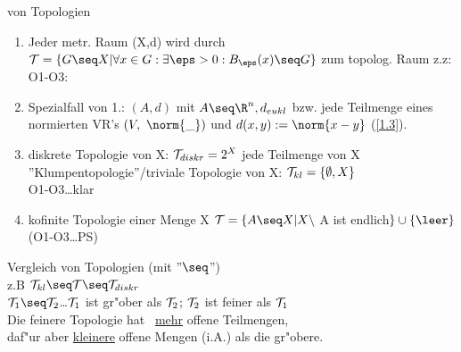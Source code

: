 \begin{beispiel}\label{2.3}{von Topologien}
\begin{enumerate}
\item Jeder metr. Raum (X,d) wird durch $\T =\{ G\seq X|\forall x\in G: \exists\eps >0: B_\eps (x)\seq G \}$ zum topolog. Raum z.z: O1-O3:
\item Spezialfall von 1.: $(A,d)$ mit $A\seq\R^n, d_{eukl}$ bzw. jede Teilmenge eines normierten VR's $(V, \norm{\_})$ und $d(x,y):=\norm{x-y}$ (\ref{1.3}).
\item diskrete Topologie von X: $\mathcal T_{diskr} =2^X$ jede Teilmenge von X\\
''Klumpentopologie''/triviale Topologie von X: $\mathcal T_{kl} = \{ \emptyset ,X\}$\\
O1-O3\dots klar
\item kofinite Topologie einer Menge X $\T =\{ A\seq X|X\setminus$ A ist endlich$\}\cup \{\leer\}$ (O1-O3\dots PS)
\end{enumerate}
\end{beispiel}

\begin{bem}\label{2.4}{Vergleich von Topologien (mit ''$\seq$'')}\\
z.B $\T_{kl}\seq\T\seq\T_{diskr}$\\
\indent $\T_1\seq\T_2$\dots $\mathcal T_1$ ist gr"ober als $\mathcal T_2$; $\mathcal T_2$ ist feiner als $\mathcal T_1$\\
Die feinere Topologie hat  \ul{mehr} offene Teilmengen,\\
daf"ur aber \ul{kleinere} offene Mengen (i.A.) als die gr"obere.
\end{bem}

